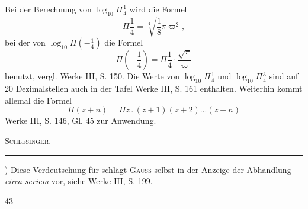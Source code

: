 Bei der Berechnung von $\log_{10}\Pi\frac14$ wird die Formel
\[\Pi\frac14=\sqrt[4]{\frac18\pi\varpi^2},\]
\noindent bei der von $\log_{10}\Pi(-\frac14)$ die Formel
\[\Pi(-\frac14)=\Pi\frac14\mathbin{\cdot}\frac{\surd\pi}{\varpi}\]
\noindent benutzt, vergl. Werke III, S. 150. Die Werte von $\log_{10}\Pi\frac14$ und $\log_{10}\Pi\frac34$ sind auf 20 Dezimalstellen auch in der Tafel Werke III, S. 161 enthalten.
Weiterhin kommt allemal die Formel
\[\Pi(z+n)=\Pi z\,{.}\,(z+1)(z+2){.}{.}{.}(z+n)\]
\noindent Werke III, S. 146, Gl. 45 zur Anwendung.
\begin{flushright}\textsc{Schlesinger.}\end{flushright}
\par{}\bigskip\noindent\rule{.25\linewidth}{.4pt}\par\smallskip
{\small\par\indent *) Diese Verdeutschung für  schlägt \textsc{Gauss} selbst in der Anzeige der Abhandlung \textit{circa seriem} vor, siehe Werke III, S. 199.\par}
\ClosingRule
\par\bigskip{}\hfill 43
\clearpage
\endgroup
